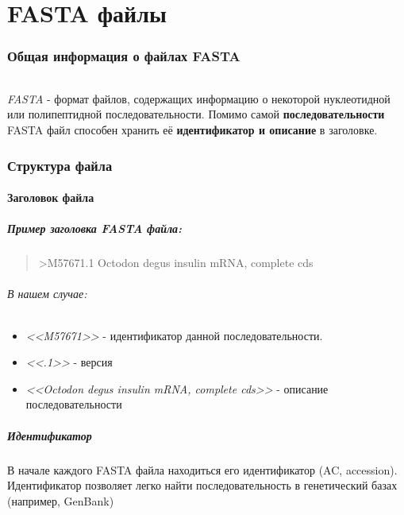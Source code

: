 \documentclass{article}
\begin{document}
    \part{FASTA файлы}
        \section{Общая информация о файлах FASTA}
            \paragraph{}
                    \emph{FASTA} - формат файлов, содержащих информацию о некоторой нуклеотидной или полипептидной последовательности.
                    Помимо самой \textbf{последовательности} FASTA файл способен хранить её \textbf{идентификатор и описание} в заголовке.
        \section {Структура файла}
            \subsection{Заголовок файла}
                \subsubsection{Пример заголовка FASTA файла:}
                    \begin{quote}
                        >M57671.1 Octodon degus insulin mRNA, complete cds
                    \end{quote}
                    \paragraph{В нашем случае:}
                        \begin{itemize}
                          \item \emph{<<M57671>>} - идентификатор данной последовательности.
                          \item \emph{<<.1>>} - версия
                          \item \emph{<<Octodon degus insulin mRNA, complete cds>>} - описание последовательности
                        \end{itemize}
                \subsubsection{Идентификатор}
                    В начале каждого FASTA файла находиться его идентификатор (AC, accession).\\
                    Идентификатор позволяет легко найти последовательность в генетический базах (например, GenBank)
\end{document}
